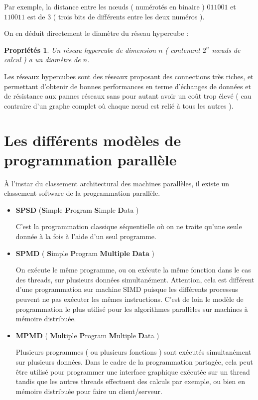 \documentclass[fleqn,11pt]{article}
\newtheorem{prop}{Propriétés }
\begin{document}
Par exemple, la distance entre les nœuds ( numérotés en binaire ) $011001$ et $110011$ est de 3 ( trois bits
de différents entre les deux numéros ).

On en déduit directement le diamètre du réseau hypercube :

\begin{prop}
Un réseau hypercube de dimension $n$ ( contenant $2^{n}$ nœuds de calcul ) a un diamètre de $n$.
\end{prop}

Les réseaux hypercubes sont des réseaux proposant des connections très riches,
et permettant d'obtenir de bonnes performances en terme d'échanges de données
et de résistance aux pannes réseaux sans pour autant avoir un coût trop élevé 
( cau contraire d'un graphe complet où chaque nœud est relié à tous les autres ).

\section{Les différents modèles de programmation parallèle}

À l'instar du classement architectural des machines parallèles, il existe
un classement software de la programmation parallèle.

\begin{itemize}
\item \textbf{SPSD} ({\bf S}imple {\bf P}rogram {\bf S}imple {\bf D}ata )

C'est la programmation classique séquentielle où on ne traite qu'une seule
donnée à la fois à l'aide d'un seul programme. 

\item \textbf{SPMD} ( {\bf S}imple {\bf P}rogram {\bf Multiple} {\bf Data} )

On exécute le même programme, ou on exécute la même fonction dans le cas des threads,
sur plusieurs données simultanément. Attention, cela est différent d'une programmation
sur machine SIMD puisque les différents processus peuvent ne pas exécuter les mêmes
instructions. C'est de loin le modèle de programmation le plus utilisé pour les
algorithmes parallèles sur machines à mémoire distribuée.

\item \textbf{MPMD} ( {\bf M}ultiple {\bf P}rogram {\bf M}ultiple {\bf D}ata )

Plusieurs programmes ( ou plusieurs fonctions ) sont exécutés simultanément
sur plusieurs données. Dans le cadre de la programmation partagée, cela peut être
utilisé pour programmer une interface graphique exécutée sur un thread tandis
que les autres threads effectuent des calculs par exemple, ou bien en mémoire
distribuée pour faire un client/serveur.
\end{itemize}
\end{document}
